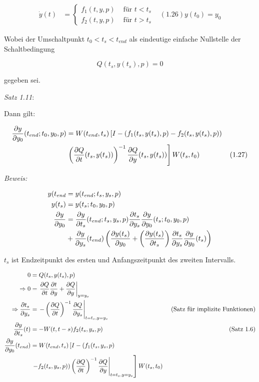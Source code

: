 \begin{align*}
\dot y(t) &= \begin{cases} f_1(t,y,p) & \text{ für } t < t_s \\ f_2(t,y,p) & \text{ für } t > t_s \end{cases} & (1.26)
y(t_0) = y_0
\end{align*}

Wobei der Umschaltpunkt $t_0 < t_s < t_{end}$ als eindeutige einfache Nullstelle der Schaltbedingung

\[ Q(t_s,y(t_s),p) = 0 \]

gegeben sei.

\emph{Satz 1.11}:

Dann gilt:

\begin{align*}
\frac{\partial y}{\partial y_0} (t_{end}; t_0,y_0,p) &= W(t_{end},t_s) \left[I-(f_1(t_s,y(t_s),p)-f_2(t_s,y(t_s),p)) \right. \\ 
& \left.\left( \frac{\partial Q}{\partial t} (t_s,y(t_s))\right)^{-1} \frac{\partial Q}{\partial y}(t_s,y(t_s)) \right] W(t_s,t_0) & (1.27) \\
\end{align*}

\emph{Beweis:}

\begin{align*}
y(t_{end} &= y(t_{end}; t_s,y_s,p) \\
y(t_s) &= y(t_s; t_0,y_0,p) \\
\frac{\partial y}{\partial y_0} &= \frac{\partial y}{\partial t_s} (t_{end}; t_s,y_s,p) \frac{\partial t_s}{\partial y_s} \frac{\partial y}{\partial y_0} (t_s; t_0,y_0,p) \\
&+ \frac{\partial y}{\partial y_s}(t_{end}) \left( \frac{\partial y(t_s)}{\partial y_0} + \left( \frac{\partial y(t_s)}{\partial t_s} \right) \frac{\partial t_s}{\partial y_s} \frac{\partial y}{\partial y_0}(t_s) \right) \\
\end{align*}

$t_s$ ist Endzeitpunkt des ersten und Anfangszeitpunkt des zweiten Intervalls.

\begin{align*}
0 &= Q(t_s,y(t_s),p) \\
\Rightarrow 0&= \left. \frac{\partial Q}{\partial t} \frac{\partial t}{\partial y} + \frac{\partial Q}{\partial y} \right|_{y=y_s} \\
\Rightarrow \frac{\partial t_s}{\partial y_s} &= \left. - \left(\frac{\partial Q}{\partial t} \right)^{-1} \frac{\partial Q}{\partial y_s}\right|_{t=t_s, y=y_s} & \text{ (Satz für implizite Funktionen)} \\
\frac{\partial y}{\partial t_s}(t) &= - W(t,t-s) f_2(t_s,y_s,p) & \text{ (Satz 1.6)} \\
\frac{\partial y}{\partial y_0} (t_{end}) &= W(t_{end}, t_s) \left[I - (f_1(t_s,y_s,p) \right. \\
& \left. \left. -f_2(t_s,y_s,p)) \left( \frac{\partial Q}{\partial t}\right)^{-1} \frac{\partial Q}{\partial y} \right|_{t=t_s, y=y_s} \right] W(t_s,t_0)
\end{align*}



